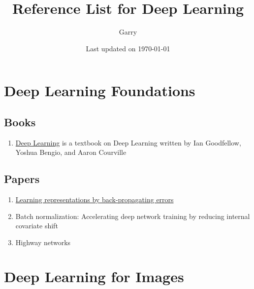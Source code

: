 \documentclass{article}
\title{Reference List for Deep Learning}
\date{Last updated on \today}
\author{Garry}
\begin{document}
\maketitle
\newpage
\tableofcontents
\newpage
{}


\section{Deep Learning Foundations}
\subsection{Books}
\begin{enumerate}
	\item \href{http://www.deeplearningbook.org/}{Deep Learning}\autocite{Goodfellow-et-al-2016} is a textbook on Deep Learning written by Ian Goodfellow, Yoshua Bengio, and Aaron Courville
\end{enumerate}
\subsection{Papers}
\begin{enumerate}
	\item \href{http://101.96.8.164/www.cs.toronto.edu/~hinton/absps/naturebp.pdf}{Learning representations by  back-propagating errors}\autocite{rumelhart1988learning}
	\item Batch normalization: Accelerating deep network training by reducing internal covariate shift\autocite{ioffe2015batch}
	\item Highway networks\autocite{srivastava2015highway}
\end{enumerate}

\section{Deep Learning for Images}
\end{document}
